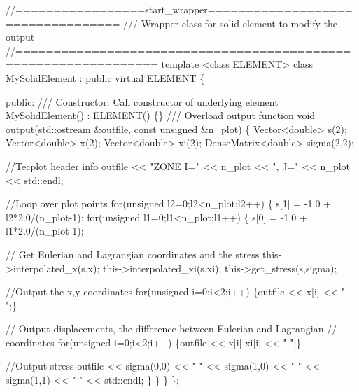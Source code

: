  
\begin{DoxyCodeInclude}
\textcolor{comment}{//=================start\_wrapper==================================}
\textcolor{comment}{/// Wrapper class for solid element to modify the output }
\textcolor{comment}{}\textcolor{comment}{//================================================================}
\textcolor{keyword}{template} <\textcolor{keyword}{class} ELEMENT>
\textcolor{keyword}{class }MySolidElement : \textcolor{keyword}{public} \textcolor{keyword}{virtual} ELEMENT
\{

\textcolor{keyword}{public}:
\textcolor{comment}{}
\textcolor{comment}{ /// Constructor: Call constructor of underlying element}
\textcolor{comment}{} MySolidElement() : ELEMENT() \{\}
\textcolor{comment}{}
\textcolor{comment}{ /// Overload output function}
\textcolor{comment}{} \textcolor{keywordtype}{void} output(std::ostream &outfile, \textcolor{keyword}{const} \textcolor{keywordtype}{unsigned} &n\_plot)
  \{
   Vector<double> s(2);
   Vector<double> x(2);
   Vector<double> xi(2);
   DenseMatrix<double> sigma(2,2);
   
   \textcolor{comment}{//Tecplot header info }
   outfile << \textcolor{stringliteral}{"ZONE I="} << n\_plot << \textcolor{stringliteral}{", J="} << n\_plot << std::endl;
   
   \textcolor{comment}{//Loop over plot points}
   \textcolor{keywordflow}{for}(\textcolor{keywordtype}{unsigned} l2=0;l2<n\_plot;l2++)
    \{
     s[1] = -1.0 + l2*2.0/(n\_plot-1);
     \textcolor{keywordflow}{for}(\textcolor{keywordtype}{unsigned} l1=0;l1<n\_plot;l1++)
      \{
       s[0] = -1.0 + l1*2.0/(n\_plot-1);
       
       \textcolor{comment}{// Get Eulerian and Lagrangian coordinates and the stress}
       this->interpolated\_x(s,x);
       this->interpolated\_xi(s,xi);
       this->get\_stress(s,sigma);
       
       \textcolor{comment}{//Output the x,y coordinates}
       \textcolor{keywordflow}{for}(\textcolor{keywordtype}{unsigned} i=0;i<2;i++) 
        \{outfile << x[i] << \textcolor{stringliteral}{" "};\}
       
       \textcolor{comment}{// Output displacements, the difference between Eulerian and Lagrangian}
       \textcolor{comment}{// coordinates}
       \textcolor{keywordflow}{for}(\textcolor{keywordtype}{unsigned} i=0;i<2;i++) 
        \{outfile << x[i]-xi[i] << \textcolor{stringliteral}{" "};\}
       
       \textcolor{comment}{//Output stress}
       outfile << sigma(0,0) << \textcolor{stringliteral}{" "}
               << sigma(1,0) << \textcolor{stringliteral}{" "}
               << sigma(1,1) << \textcolor{stringliteral}{" "}
               << std::endl;
      \}
    \}  
  \}
\};

\end{DoxyCodeInclude}
 

